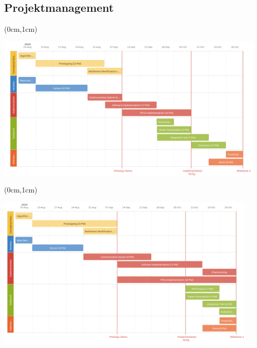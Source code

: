 \documentclass{beamer}
\begin{document}
\subsection{Projektmanagement}
\begin{frame}{\subsecname}
\begin{textblock*}{12.7cm}(0cm,1cm)
\begin{center}
\includegraphics[height=6.9cm]{images/roadmap.png}
\end{center}
\end{textblock*}
\end{frame}

\begin{frame}{\subsecname}
\begin{textblock*}{12.7cm}(0cm,1cm)
\begin{center}
\includegraphics[height=7.3cm]{images/roadmap_new.png}
\end{center}
\end{textblock*}
\end{frame}
\end{document}
